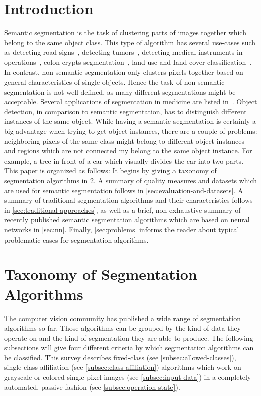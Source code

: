 \documentclass[technote,a4paper,leqno]{IEEEtran}
\title{\titleboth}
\author{Martin Thoma\\%
info@martin-thoma.de
}
\begin{document}
\maketitle

\section{Introduction}\label{sec:introduction}
Semantic segmentation is the task of clustering parts of images together which
belong to the same object class. This type of algorithm has several use-cases
such as detecting road signs~\cite{4220659}, detecting
tumors~\cite{moon2002automatic}, detecting medical instruments in
operations~\cite{wei1997automatic}, colon crypts
segmentation~\cite{cohen2015memory}, land use and land cover
classification~\cite{huang2002assessment}. In contrast, non-semantic
segmentation only clusters pixels together based on general characteristics of
single objects. Hence the task of non-semantic segmentation is not
well-defined, as many different segmentations might be acceptable.
Several applications of segmentation in medicine are listed
in~\cite{annurev.bioeng.2.1.315}.
Object detection, in comparison to semantic segmentation, has to distinguish
different instances of the same object. While having a semantic segmentation is
certainly a big advantage when trying to get object instances, there are a
couple of problems: neighboring pixels of the same class might belong to
different object instances and regions which are not connected my belong to the
same object instance. For example, a tree in front of a car which visually
divides the car into two parts.
This paper is organized as follows: It begins by giving a taxonomy of
segmentation algorithms in \cref{sec:taxonomy}. A summary of quality measures
and datasets which are used for semantic segmentation follows in
\cref{sec:evaluation-and-datasets}. A summary of traditional
segmentation algorithms and their characteristics follows in
\cref{sec:traditional-approaches}, as well as a brief, non-exhaustive
summary of recently published semantic segmentation algorithms which are based
on neural networks in \cref{sec:nn}. Finally, \cref{sec:problems} informs the
reader about typical problematic cases for segmentation algorithms.
\section{Taxonomy of Segmentation Algorithms}\label{sec:taxonomy}
The computer vision community has published a wide range of segmentation
algorithms so far. Those algorithms can be grouped by the kind of data they
operate on and the kind of segmentation they are able to produce.
The following subsections will give four different criteria by which
segmentation algorithms can be classified.
This survey describes fixed-class (see \cref{subsec:allowed-classes}),
single-class affiliation (see \cref{subsec:class-affiliation}) algorithms which
work on grayscale or colored single pixel images (see \cref{subsec:input-data})
in a completely automated, passive fashion (see \cref{subsec:operation-state}).
\end{document}
